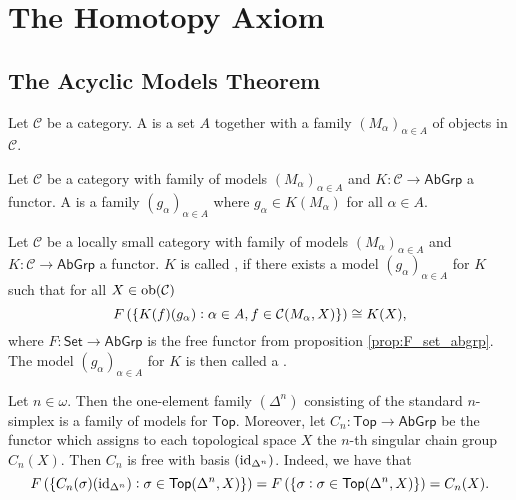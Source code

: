 \section*{The Homotopy Axiom}
\subsection*{The Acyclic Models Theorem}
\begin{definition}[Models]
	Let $\mathcal{C}$ be a category. A  is a set $A$ together with a family $(M_\alpha)_{\alpha \in A}$ of objects in $\mathcal{C}$.
\end{definition}

\begin{definition}[$K$-Models]
	Let $\mathcal{C}$ be a category with family of models $(M_\alpha)_{\alpha \in A}$ and $K : \mathcal{C} \to \mathsf{AbGrp}$ a functor. A  is a family $(g_\alpha)_{\alpha \in A}$ where $g_\alpha \in K(M_\alpha)$ for all $\alpha \in A$.
\end{definition}

\begin{definition}
	Let $\mathcal{C}$ be a locally small category with family of models $(M_\alpha)_{\alpha \in A}$ and $K : \mathcal{C} \to \mathsf{AbGrp}$ a functor. $K$ is called , if there exists a model $(g_\alpha)_{\alpha \in A}$ for $K$ such that for all $X \in \operatorname{ob}(\mathcal{C})$
	\begin{equation}
		F\del[0]{\cbr[0]{K(f)(g_\alpha) : \alpha \in A, f \in \mathcal{C}(M_\alpha,X)}} \cong K(X),
	\end{equation}
	\noindent where $F : \mathsf{Set} \to \mathsf{AbGrp}$ is the free functor from proposition \ref{prop:F_set_abgrp}. The model $(g_\alpha)_{\alpha \in A}$ for $K$ is then called a .
\end{definition}

\begin{example}
	Let $n \in \omega$. Then the one-element family $(\Delta^n)$ consisting of the standard $n$-simplex is a family of models for $\mathsf{Top}$. Moreover, let $C_n : \mathsf{Top} \to \mathsf{AbGrp}$ be the functor which assigns to each topological space $X$ the $n$-th singular chain group $C_n(X)$. Then $C_n$ is free with basis $(\operatorname{id}_{\Delta^n})$. Indeed, we have that
\begin{equation*}
	F\del[0]{\cbr[0]{C_n(\sigma)(\id_{\Delta^n}) : \sigma \in \mathsf{Top}(\Delta^n,X)}} = F\del[0]{\cbr[0]{\sigma : \sigma \in \mathsf{Top}(\Delta^n,X)}} = C_n(X).
\end{equation*}
\end{example}

